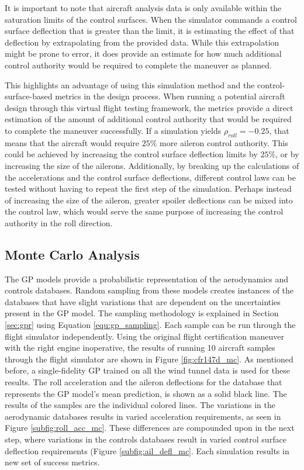 It is important to note that aircraft analysis data is only available within the saturation limits of the control surfaces. 
When the simulator commands a control surface deflection that is greater than the limit, it is estimating the effect of that deflection by extrapolating from the provided data. 
While this extrapolation might be prone to error, it does provide an estimate for how much additional control authority would be required to complete the maneuver as planned. 

This highlights an advantage of using this simulation method and the control-surface-based metrics in the design process. 
When running a potential aircraft design through this virtual flight testing framework, the metrics provide a direct estimation of the amount of additional control authority that would be required to complete the maneuver successfully. 
If a simulation yields $\rho_{roll} = -0.25$, that means that the aircraft would require $25\%$ more aileron control authority. 
This could be achieved by increasing the control surface deflection limits by $25\%$, or by increasing the size of the ailerons. 
Additionally, by breaking up the calculations of the accelerations and the control surface deflections, different control laws can be tested without having to repeat the first step of the simulation. 
Perhaps instead of increasing the size of the aileron, greater spoiler deflections can be mixed into the control law, which would serve the same purpose of increasing the control authority in the roll direction. 

\subsection{Monte Carlo Analysis} \label{subsec:mc_analysis}

The GP models provide a probabilistic representation of the aerodynamics and controls databases. 
Random sampling from these models creates instances of the databases that have slight variations that are dependent on the uncertainties present in the GP model.
The sampling methodology is explained in Section \ref{sec:gpr} using Equation \ref{equ:gp_sampling}.
Each sample can be run through the flight simulator independently.
Using the original flight certification maneuver with the right engine inoperative, the results of running 10 aircraft samples through the flight simulator are shown in Figure \ref{fig:cfr147d_mc}.
As mentioned before, a single-fidelity GP trained on all the wind tunnel data is used for these results. 
The roll acceleration and the aileron deflections for the database that represents the GP model's mean prediction, is shown as a solid black line. 
The results of the samples are the individual colored lines. 
The variations in the aerodynamic databases results in varied acceleration requirements, as seen in Figure \ref{subfig:roll_acc_mc}.
These differences are compounded upon in the next step, where variations in the controls databases result in varied control surface deflection requirements (Figure \ref{subfig:ail_defl_mc}.
Each simulation results in new set of success metrics. 

